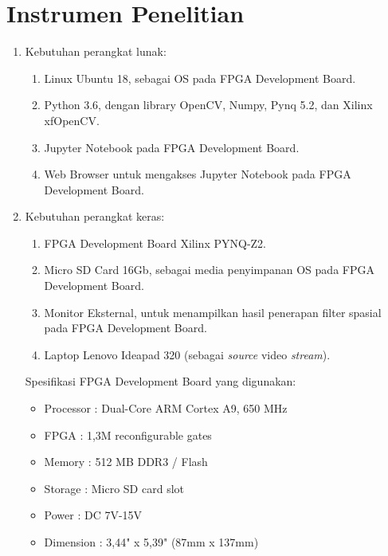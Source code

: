 \section{Instrumen Penelitian}
\begin{enumerate}[topsep=0pt,itemsep=0pt,partopsep=0pt, parsep=0pt]
    \item Kebutuhan perangkat lunak:
    \begin{enumerate}[topsep=0pt,itemsep=0pt,partopsep=0pt, parsep=0pt, label={\alph*.}]
        \item Linux Ubuntu 18, sebagai OS pada FPGA Development Board.
        \item Python 3.6, dengan library OpenCV, Numpy, Pynq 5.2, dan Xilinx xfOpenCV.
        \item Jupyter Notebook pada FPGA Development Board. 
        \item Web Browser untuk mengakses Jupyter Notebook pada FPGA Development Board.
    \end{enumerate}
    \item Kebutuhan perangkat keras:
    \begin{enumerate}[topsep=0pt,itemsep=0pt,partopsep=0pt, parsep=0pt, label={\alph*.}]
        \item FPGA Development Board Xilinx PYNQ-Z2.
        \item Micro SD Card 16Gb, sebagai media penyimpanan OS pada FPGA Development Board.
        \item Monitor Eksternal, untuk menampilkan hasil penerapan filter spasial pada FPGA Development Board.
        \item Laptop Lenovo Ideapad 320 (sebagai \textit{source} video \textit{stream}).
    \end{enumerate}

    Spesifikasi FPGA Development Board yang digunakan:
    \begin{itemize}[topsep=0pt,itemsep=0pt,partopsep=0pt, parsep=0pt]
        \item Processor : Dual-Core ARM Cortex A9, 650 MHz
        \item FPGA : 1,3M reconfigurable gates
        \item Memory : 512 MB DDR3 / Flash
        \item Storage : Micro SD card slot
        \item Power : DC 7V-15V
        \item Dimension : 3,44" x 5,39" (87mm x 137mm)
    \end{itemize}
\end{enumerate}



